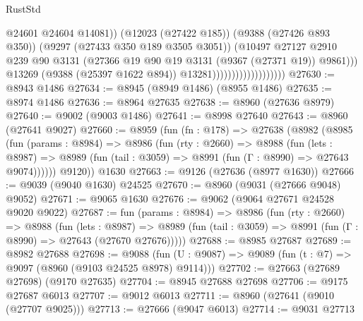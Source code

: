 \begin{lexlean}{RustStd}
\begin{coremodule}
                                                @24601
                                                @24604
                                                @14081))
                                            (@12023 (@27422 @185))
                                            (@9388 (@27426 @893 @350))
                                            (@9297 (@27433 @350 @189 @3505 @3051))
                                            (@10497
                                              @27127
                                              @2910
                                              @239
                                              @90
                                              @3131
                                              (@27366
                                                @19
                                                @90
                                                @19
                                                @3131
                                                (@9367 (@27371 @19))
                                                @9861)))
                                          @13269
                                          (@9388 (@25397 @1622 @894))
                                          @13281)))))))))))))))))))
@27630 := @8943 @1486
@27634 := @8945 (@8949 @1486) (@8955 @1486)
@27635 := @8974 @1486
@27636 := @8964 @27635
@27638 := @8960 (@27636 @8979)
@27640 := @9002 (@9003 @1486)
@27641 := @8998 @27640
@27643 := @8960 (@27641 @9027)
@27660 := @8959
    (fun (fn : @178) =>
    @27638
      (@8982
        (@8985
          (fun (params : @8984) =>
          @8986
            (fun (rty : @2660) =>
            @8988
              (fun (lets : @8987) =>
              @8989 (fun (tail : @3059) => @8991 (fun (Γ : @8990) => @27643 @9074))))))
        @9120))
    @1630
@27663 := @9126 (@27636 (@8977 @1630))
@27666 := @9039 (@9040 @1630) @24525
@27670 := @8960 (@9031 (@27666 @9048) @9052)
@27671 := @9065 @1630
@27676 := @9062 (@9064 @27671 @24528 @9020 @9022)
@27687 := fun (params : @8984) =>
  @8986
    (fun (rty : @2660) =>
    @8988
      (fun (lets : @8987) =>
      @8989 (fun (tail : @3059) => @8991 (fun (Γ : @8990) => @27643 (@27670 @27676)))))
@27688 := @8985 @27687
@27689 := @8982 @27688
@27698 := @9088
    (fun (U : @9087) => @9089 (fun (t : @7) => @9097 (@8960 (@9103 @24525 @8978) @9114)))
@27702 := @27663 (@27689 @27698) (@9170 @27635)
@27704 := @8945 @27688 @27698
@27706 := @9175 @27687 @6013
@27707 := @9012 @6013
@27711 := @8960 (@27641 (@9010 (@27707 @9025)))
@27713 := @27666 (@9047 @6013)
@27714 := @9031 @27713

\end{coremodule}
\end{lexlean}
